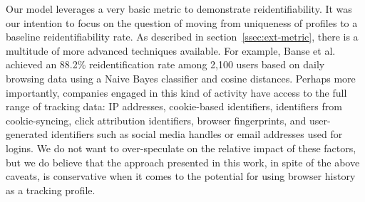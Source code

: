 \documentclass[letterpaper,twocolumn,10pt]{article}
\begin{document}
Our model leverages a very basic metric to demonstrate reidentifiability.
It was our intention to focus on the question of moving from uniqueness of profiles to a baseline reidentifiability rate. 
As described in section~\ref{ssec:ext-metric}, there is a multitude of more advanced techniques available. 
For example, Banse et al.~\cite{Banse_2012} achieved an 88.2\% reidentification rate among 2,100 users based on daily browsing data using a Naive Bayes classifier and cosine distances.
Perhaps more importantly, companies engaged in this kind of activity have access to the full range of tracking data: IP addresses, cookie-based identifiers, identifiers from cookie-syncing, click attribution identifiers, browser fingerprints, and user-generated identifiers such as social media handles or email addresses used for logins.
We do not want to over-speculate on the relative impact of these factors, but we do believe that the approach presented in this work, in spite of the above caveats, is conservative when it comes to the potential for using browser history as a tracking profile.
\end{document}

